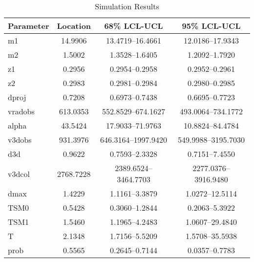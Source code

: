 
\begin{table}[ht]
\centering
\begin{tabular}{lccc}
\hline
Parameter & Location & 68\% LCL-UCL & 95\% LCL-UCL \\
\hline
m1 & 14.9906 & 13.4719--16.4661 & 12.0186--17.9343 \\
m2 & 1.5002 & 1.3528--1.6405 & 1.2092--1.7920 \\
z1 & 0.2956 & 0.2954--0.2958 & 0.2952--0.2961 \\
z2 & 0.2983 & 0.2981--0.2984 & 0.2980--0.2985 \\
dproj & 0.7208 & 0.6973--0.7438 & 0.6695--0.7723 \\
vradobs & 613.0353 & 552.8529--674.1627 & 493.0064--734.1772 \\
alpha & 43.5424 & 17.9033--71.9763 & 10.8824--84.4784 \\
v3dobs & 931.3976 & 646.3164--1997.9420 & 549.9988--3195.7030 \\
d3d & 0.9622 & 0.7593--2.3328 & 0.7151--7.4550 \\
v3dcol & 2768.7228 & 2389.6524--3464.7703 & 2277.0376--3916.9480 \\
dmax & 1.4229 & 1.1161--3.3879 & 1.0272--12.5114 \\
TSM0 & 0.5428 & 0.3060--1.2844 & 0.2063--5.3922 \\
TSM1 & 1.5460 & 1.1965--4.2483 & 1.0607--29.4840 \\
T & 2.1348 & 1.7156--5.5209 & 1.5708--35.5938 \\
prob & 0.5565 & 0.2645--0.7144 & 0.0357--0.7783 \\
\hline
\end{tabular}
\caption{Simulation Results}
\label{tab:results}
\end{table}
